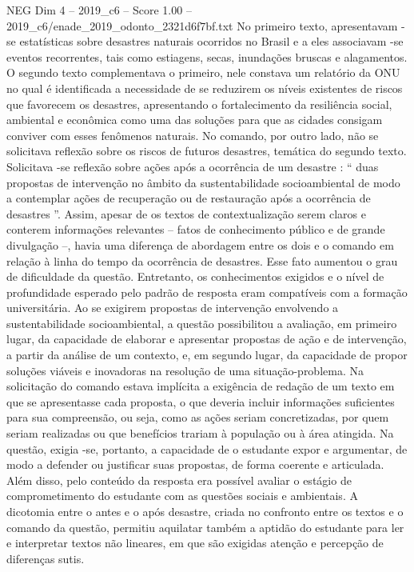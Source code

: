 \begin{textsample}{NEG Dim 4 – 2019\_c6 – Score 1.00 – 2019\_c6/enade\_2019\_odonto\_2321d6f7bf.txt}
No primeiro texto, apresentavam -se estatísticas sobre desastres naturais ocorridos no Brasil e a eles associavam -se eventos recorrentes, tais como estiagens, secas, inundações bruscas e alagamentos.
O segundo texto complementava o primeiro, nele constava um relatório da ONU no qual é identificada a necessidade de se reduzirem os níveis existentes de riscos que favorecem os desastres, apresentando o fortalecimento da resiliência social, ambiental e econômica como uma das soluções para que as cidades consigam conviver com esses fenômenos naturais.
No comando, por outro lado, não se solicitava reflexão sobre os riscos de futuros desastres, temática do segundo texto.
Solicitava -se reflexão sobre ações após a ocorrência de um desastre : “ duas propostas de intervenção no âmbito da sustentabilidade socioambiental de modo a contemplar ações de recuperação ou de restauração após a ocorrência de desastres ”.
Assim, apesar de os textos de contextualização serem claros e conterem informações relevantes – fatos de conhecimento público e de grande divulgação –, havia uma diferença de abordagem entre os dois e o comando em relação à linha do tempo da ocorrência de desastres.
Esse fato aumentou o grau de dificuldade da questão.
Entretanto, os conhecimentos exigidos e o nível de profundidade esperado pelo padrão de resposta eram compatíveis com a formação universitária.
Ao se exigirem propostas de intervenção envolvendo a sustentabilidade socioambiental, a questão possibilitou a avaliação, em primeiro lugar, da capacidade de elaborar e apresentar propostas de ação e de intervenção, a partir da análise de um contexto, e, em segundo lugar, da capacidade de propor soluções viáveis e inovadoras na resolução de uma situação-problema.
Na solicitação do comando estava implícita a exigência de redação de um texto em que se apresentasse cada proposta, o que deveria incluir informações suficientes para sua compreensão, ou seja, como as ações seriam concretizadas, por quem seriam realizadas ou que benefícios trariam à população ou à área atingida.
Na questão, exigia -se, portanto, a capacidade de o estudante expor e argumentar, de modo a defender ou justificar suas propostas, de forma coerente e articulada.
Além disso, pelo conteúdo da resposta era possível avaliar o estágio de comprometimento do estudante com as questões sociais e ambientais.
A dicotomia entre o antes e o após desastre, criada no confronto entre os textos e o comando da questão, permitiu aquilatar também a aptidão do estudante para ler e interpretar textos não lineares, em que são exigidas atenção e percepção de diferenças sutis.

\end{textsample}
